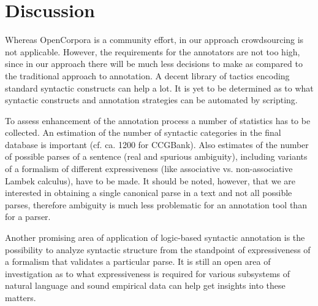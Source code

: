 \documentclass[a4paper]{article}
\theoremstyle{example-style}
\begin{document}
\section{Discussion}

Whereas OpenCorpora is a community effort, in our approach crowdsourcing is not applicable. However, the requirements for the annotators are not too high, since in our approach there will be much less decisions to make as compared to the traditional approach to annotation. A decent library of tactics encoding standard syntactic constructs can help a lot. It is yet to be determined as to what syntactic constructs and annotation strategies can be automated by scripting.

To assess enhancement of the annotation process a number of statistics has to be collected. An estimation of the number of syntactic categories in the final database is important (cf. ca. 1200 for CCGBank). Also estimates of the number of possible parses of a sentence (real and spurious ambiguity), including variants of a formalism of different expressiveness (like associative vs. non-associative Lambek calculus), have to be made. It should be noted, however, that we are interested in obtaining a single canonical parse in a text and not all possible parses, therefore ambiguity is much less problematic for an annotation tool than for a parser.
  
Another promising area of application of logic-based syntactic annotation is the possibility to analyze syntactic structure from the standpoint of expressiveness of a formalism that validates a particular parse. It is still an open area of investigation as to what expressiveness is required for various subsystems of natural language and sound empirical data can help get insights into these matters.



\printbibliography[resetnumbers=true]
\end{document}
